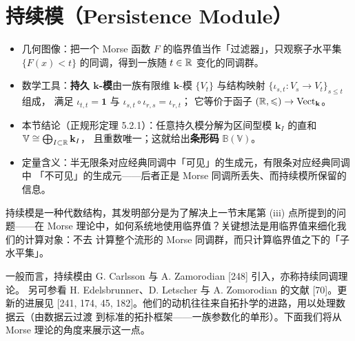 \section{持续模（Persistence Module）}

\begin{keytakeaways}
\begin{itemize}
  \item 几何图像：把一个 Morse 函数 $F$ 的临界值当作「过滤器」，只观察子水平集
        $\{F(x)<t\}$ 的同调，得到一族随 $t\in\mathbb{R}$ 变化的同调群。
  \item 数学工具：\textbf{持久 $\mathbf k$-模}由一族有限维 $\mathbf k$-模
        $\{V_t\}$ 与结构映射 $\{\iota_{s,t}:V_s\to V_t\}_{s\leqslant t}$ 组成，
        满足 $\iota_{t,t}=\mathbf 1$ 与 $\iota_{s,t}\circ\iota_{r,s}=\iota_{r,t}$；
        它等价于函子 $(\mathbb{R},\leqslant)\to\mathrm{Vect}_{\mathbf k}$。
  \item 本节结论（正规形定理 5.2.1）：任意持久模分解为区间型模
        $\mathbf k_I$ 的直和 $\mathbb V\cong\bigoplus_{I\subset\mathbb{R}}\mathbf k_I$，
        且重数唯一；这就给出\textbf{条形码} $\mathbb B(\mathbb V)$。
  \item 定量含义：半无限条对应经典同调中「可见」的生成元，有限条对应经典同调中
        「不可见」的生成元——后者正是 Morse 同调所丢失、而持续模所保留的信息。
\end{itemize}
\end{keytakeaways}

持续模是一种代数结构，其发明部分是为了解决上一节末尾第 (iii) 点所提到的问题——在
Morse 理论中，如何系统地使用临界值？关键想法是用临界值来细化我们的计算对象：不去
计算整个流形的 Morse 同调群，而只计算临界值之下的「子水平集」。

一般而言，持续模由 G. Carlsson 与 A. Zamorodian [248] 引入，亦称持续同调理论。
另可参看 H. Edelsbrunner、D. Letscher 与 A. Zomorodian 的文献 [70]。更新的进展见
[241, 174, 45, 182]。他们的动机往往来自拓扑学的进路，用以处理数据云（由数据云过渡
到标准的拓扑框架——一族参数化的单形）。下面我们将从 Morse 理论的角度来展示这一点。


